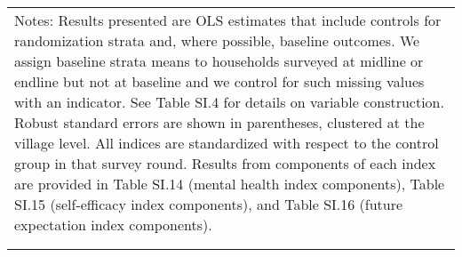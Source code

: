 \begin{longtable}{llcccccccccc}
\multicolumn{12}{p{\textwidth}}{{Notes: Results presented are OLS estimates that include controls for randomization strata and, where possible, baseline outcomes. We assign baseline strata means to households surveyed at midline or endline but not at baseline and we control for such missing values with an indicator. See Table SI.4 for details on variable construction. Robust standard errors are shown in parentheses, clustered at the village level. All indices are standardized with respect to the control group in that survey round. Results from components of each index are provided in Table SI.14 (mental health index components), Table SI.15 (self-efficacy index components), and Table SI.16 (future expectation index components).}} \\                                                                                                                                            
\multicolumn{12}{p{\textwidth}}{{}} \\                                                                                                                                                                                                                                                                                                                                                                                                                                                                                                                                                                                                                                                                                                                                                                                                                                                                            
\endlastfoot                                                                                                                                                                                                                                                                                                                                                                                                                                                                                                                                                                                                                                                                                                                                                                                                                                                                                                      

\end{longtable}
